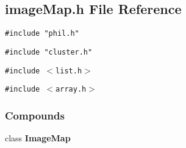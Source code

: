 \subsection{image\-Map.h File Reference}
\label{imageMap.h}
{\tt \#include "phil.h"}\par
{\tt \#include "cluster.h"}\par
{\tt \#include $<$list.h$>$}\par
{\tt \#include $<$array.h$>$}\par
\subsubsection*{Compounds}
\begin{CompactItemize}
\item 
class {\bf Image\-Map}
\end{CompactItemize}
